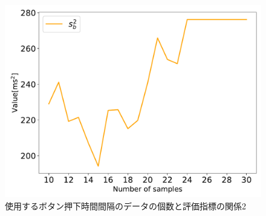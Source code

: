 \begin{figure}[tbp]
  \centering
  \includegraphics[scale=0.6]{figures/Yobi/Var/NumberOfSamples_varSb.pdf}
  \caption{使用するボタン押下時間間隔のデータの個数と評価指標の関係2}
  \label{fig:Numberofsamples_Sb}
\end{figure}

